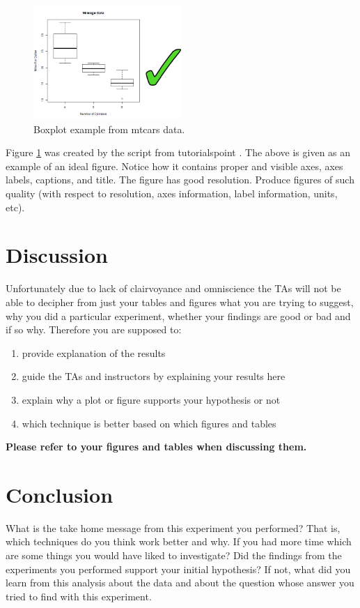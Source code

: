 \documentclass[a4paper]{article}
\begin{document}
\begin{figure}[h]
\begin{center}
\includegraphics[width=0.5\textwidth]{boxplot}
\caption{Boxplot example from mtcars data.}
\label{fig:rboxplot}
\end{center}
\end{figure}
Figure \ref{fig:rboxplot} was created by the script from tutorialspoint \cite{Rboxplot}. The above is given as an example of an ideal figure. Notice how it contains proper and visible axes, axes labels, 
captions, and title. The figure has good resolution. Produce figures of such quality (with respect to resolution, axes information, label information, units, etc).
\section{Discussion}
Unfortunately due to lack of clairvoyance and omniscience the TAs will not be able to decipher from just your tables and figures what you are trying to suggest, why you did a particular experiment, whether your 
findings are good or bad and if so why. Therefore you are supposed to: 
\begin{enumerate}
 \item provide explanation of the results
 \item guide the TAs and instructors by explaining your results here
 \item explain why a plot or figure supports your hypothesis or not
 \item which technique is better based on which figures and tables
\end{enumerate}
\textbf{Please refer to your figures and tables when discussing them.}
\section{Conclusion}
What is the take home message from this experiment you performed? That is, which techniques do you think work better and why. If you had more time which are some things you would have liked to investigate? Did the 
findings from the experiments you performed support your initial hypothesis? If not, what did you learn from this analysis about the data and about the question whose answer you tried to find with this experiment. 



\end{document}
